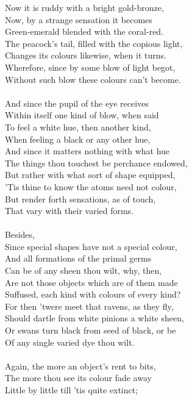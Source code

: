 Now it is ruddy with a bright gold-bronze,\\
Now, by a strange sensation it becomes\\
Green-emerald blended with the coral-red.\\
The peacock's tail, filled with the copious light,\\
Changes its colours likewise, when it turns.\\
Wherefore, since by some blow of light begot,\\
Without such blow these colours can't become.\\
\\
And since the pupil of the eye receives\\
Within itself one kind of blow, when said\\
To feel a white hue, then another kind,\\
When feeling a black or any other hue,\\
And since it matters nothing with what hue\\
The things thou touchest be perchance endowed,\\
But rather with what sort of shape equipped,\\
'Tis thine to know the atoms need not colour,\\
But render forth sensations, as of touch,\\
That vary with their varied forms.\\
\\
Besides,\\
Since special shapes have not a special colour,\\
And all formations of the primal germs\\
Can be of any sheen thou wilt, why, then,\\
Are not those objects which are of them made\\
Suffused, each kind with colours of every kind?\\
For then 'twere meet that ravens, as they fly,\\
Should dartle from white pinions a white sheen,\\
Or swans turn black from seed of black, or be\\
Of any single varied dye thou wilt.\\
\\
Again, the more an object's rent to bits,\\
The more thou see its colour fade away\\
Little by little till 'tis quite extinct;\\
